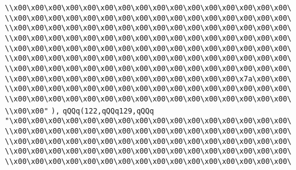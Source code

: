 \verb|\\x00\x00\x00\x00\x00\x00\x00\x00\x00\x00\x00\x00\x00\x00\x00\x00\|\newline
\verb|\\x00\x00\x00\x00\x00\x00\x00\x00\x00\x00\x00\x00\x00\x00\x00\x00\|\newline
\verb|\\x00\x00\x00\x00\x00\x00\x00\x00\x00\x00\x00\x00\x00\x00\x00\x00\|\newline
\verb|\\x00\x00\x00\x00\x00\x00\x00\x00\x00\x00\x00\x00\x00\x00\x00\x00\|\newline
\verb|\\x00\x00\x00\x00\x00\x00\x00\x00\x00\x00\x00\x00\x00\x00\x00\x00\|\newline
\verb|\\x00\x00\x00\x00\x00\x00\x00\x00\x00\x00\x00\x00\x00\x00\x00\x00\|\newline
\verb|\\x00\x00\x00\x00\x00\x00\x00\x00\x00\x00\x00\x00\x00\x00\x00\x00\|\newline
\verb|\\x00\x00\x00\x00\x00\x00\x00\x00\x00\x00\x00\x00\x00\x7a\x00\x00\|\newline
\verb|\\x00\x00\x00\x00\x00\x00\x00\x00\x00\x00\x00\x00\x00\x00\x00\x00\|\newline
\verb|\\x00\x00\x00\x00\x00\x00\x00\x00\x00\x00\x00\x00\x00\x00\x00\x00\|\newline
\verb|\\x00\x00"|\newline
\verb|),|\newline
\verb|qQQq(122,qQQq129,qQQq|\newline
\verb|"\x00\x00\x00\x00\x00\x00\x00\x00\x00\x00\x00\x00\x00\x00\x00\x00\|\newline
\verb|\\x00\x00\x00\x00\x00\x00\x00\x00\x00\x00\x00\x00\x00\x00\x00\x00\|\newline
\verb|\\x00\x00\x00\x00\x00\x00\x00\x00\x00\x00\x00\x00\x00\x00\x00\x00\|\newline
\verb|\\x00\x00\x00\x00\x00\x00\x00\x00\x00\x00\x00\x00\x00\x00\x00\x00\|\newline
\verb|\\x00\x00\x00\x00\x00\x00\x00\x00\x00\x00\x00\x00\x00\x00\x00\x00\|\newline
